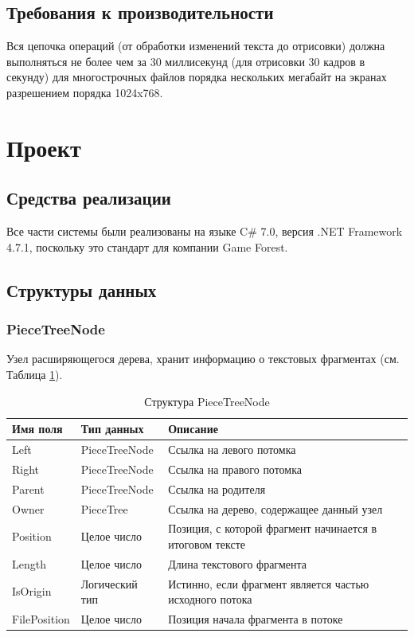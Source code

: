 \documentclass{fefu}
\begin{document}
		\subsection{Требования к производительности}
			Вся цепочка операций (от обработки изменений текста до 
			отрисовки) должна выполняться не более чем за 30 миллисекунд (для отрисовки 30 
			кадров в секунду) для многострочных файлов порядка нескольких мегабайт на экранах
			разрешением порядка 1024x768. %
	\section{Проект}
		\subsection{Средства реализации}
			Все части системы были реализованы на языке C\# 7.0, 
			версия .NET Framework 4.7.1, поскольку это стандарт для компании Game Forest.
		\subsection{Структуры данных}
			\subsubsection{PieceTreeNode}
				\par Узел расширяющегося дерева, хранит информацию о 
				текстовых фрагментах (см. Таблица \ref{table:PieceTreeNode}).
				\begin{table}[h]
					\centering
					\begin{tabular}{|l|l|p{10cm}|}
						\hline
						\textbf{Имя поля} & \textbf{Тип данных} & \textbf{Описание} \\
						\hline
						Left & PieceTreeNode & Ссылка на левого потомка\\
						\hline
						Right & PieceTreeNode & Ссылка на правого потомка \\
						\hline
						Parent & PieceTreeNode & Ссылка на родителя \\
						\hline
						Owner & PieceTree & Ссылка на дерево, содержащее данный узел \\
						\hline
						Position & Целое число & Позиция, с которой фрагмент начинается в 
						итоговом тексте \\
						\hline
						Length & Целое число & Длина текстового фрагмента \\
						\hline
						IsOrigin & Логический тип & Истинно, если фрагмент является частью 
						исходного потока \\
						\hline
						FilePosition & Целое число & Позиция начала фрагмента в потоке \\
						\hline
					\end{tabular}
					\caption{Структура PieceTreeNode}
					\label{table:PieceTreeNode}
				\end{table}
\end{document}
